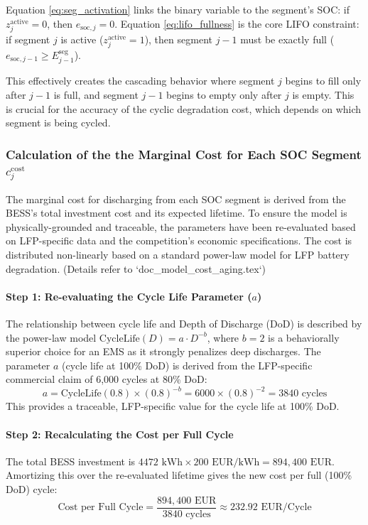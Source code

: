 \documentclass[11pt, a4paper]{article}
\begin{document}
Equation \eqref{eq:seg_activation} links the binary variable to the segment's SOC: if $z^{\text{active}}_j = 0$, then $e_{\mathrm{soc},j} = 0$.
Equation \eqref{eq:lifo_fullness} is the core LIFO constraint: if segment $j$ is active ($z^{\text{active}}_j = 1$), then segment $j-1$ must be exactly full ($e_{\mathrm{soc},j-1} \ge E^{\mathrm{seg}}_{j-1}$).

This effectively creates the cascading behavior where segment $j$ begins to fill only after $j-1$ is full, and segment $j-1$ begins to empty only after $j$ is empty. This is crucial for the accuracy of the cyclic degradation cost, which depends on which segment is being cycled.

\subsubsection{Calculation of the the Marginal Cost for Each SOC Segment $c^{\mathrm{cost}}_{j}$}
The marginal cost for discharging from each SOC segment is derived from the BESS's total investment cost and its expected lifetime. To ensure the model is physically-grounded and traceable, the parameters have been re-evaluated based on LFP-specific data and the competition's economic specifications. The cost is distributed non-linearly based on a standard power-law model for LFP battery degradation.
(Details refer to `doc_model\aging_cost\cyclic_aging.tex`)

\paragraph{Step 1: Re-evaluating the Cycle Life Parameter ($a$)}
The relationship between cycle life and Depth of Discharge (DoD) is described by the power-law model $\text{CycleLife}(D) = a \cdot D^{-b}$, where $b=2$ is a behaviorally superior choice for an EMS as it strongly penalizes deep discharges. The parameter $a$ (cycle life at 100\% DoD) is derived from the LFP-specific commercial claim of 6,000 cycles at 80\% DoD:
\begin{equation*}
    a = \text{CycleLife}(0.8) \times (0.8)^{-b} = 6000 \times (0.8)^{-2} = 3840 \text{ cycles}
\end{equation*}
This provides a traceable, LFP-specific value for the cycle life at 100\% DoD.

\paragraph{Step 2: Recalculating the Cost per Full Cycle}
The total BESS investment is $4472 \text{ kWh} \times 200 \text{ EUR/kWh} = 894,400 \text{ EUR}$. Amortizing this over the re-evaluated lifetime gives the new cost per full (100\% DoD) cycle:
\begin{equation*}
    \text{Cost per Full Cycle} = \frac{894,400 \text{ EUR}}{3840 \text{ cycles}} \approx 232.92 \text{ EUR/Cycle}
\end{equation*}
\end{document}
